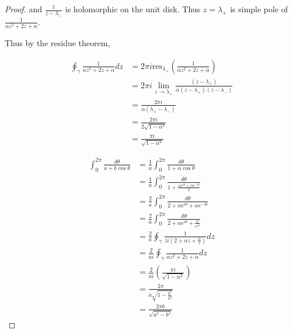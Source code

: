 \documentclass{article}
\begin{document}
\begin{proof}
    and $\frac{1}{z - \lambda_-}$ is holomorphic on the unit disk. Thus $z = \lambda_+$ is simple pole of $\frac{1}{\alpha z^2 + 2 z + \alpha}$. 
    
    
    Thus by the residue theorem, 

    \begin{align*}
        \oint_{\gamma} \frac{1}{\alpha z^2 + 2 z + \alpha} dz &= 2 \pi i \text{res}_{\lambda_{+}}\left(\frac{1}{\alpha z^2 + 2z + \alpha}\right) \\
        &= 2 \pi i \lim_{z \to \lambda_+} \frac{(z - \lambda_+)}{\alpha (z - \lambda_+)(z - \lambda_-)} \\
        &= \frac{2 \pi i}{\alpha(\lambda_+ - \lambda_-)} \\
        &= \frac{2 \pi i}{2\sqrt{1 - \alpha^2}} \\
        &= \frac{\pi i}{\sqrt{1 - \alpha^2}} 
    \end{align*}

    \begin{align*}
        \int_{0}^{2 \pi} \frac{d \theta}{a + b \cos \theta} 
        &= \frac{1}{a} \int_{0}^{2 \pi} \frac{d \theta}{1 + \alpha \cos \theta} \\
        &= \frac{1}{a} \int_{0}^{2 \pi} \frac{d \theta}{1 + \frac{\alpha e^{i \theta} + \alpha e^{-i \theta}}{2}} \\
        &= \frac{2}{a} \int_{0}^{2 \pi} \frac{d \theta}{2 + \alpha e^{i \theta} + \alpha e^{-i \theta}} \\
        &= \frac{2}{a} \int_{0}^{2 \pi} \frac{d \theta}{2 + \alpha e^{i \theta} + \frac{\alpha}{e^{i \theta}}}\\
        &= \frac{2}{a} \oint_{\gamma} \frac{1}{zi(2 + \alpha z + \frac{\alpha}{z})} dz \\
        &= \frac{2}{ai} \oint_{\gamma} \frac{1}{\alpha z^2 + 2 z + \alpha} dz \\
        &= \frac{2}{ai} \left(\frac{\pi i}{\sqrt{1 - \alpha^2}}\right) \\
        &= \frac{2 \pi}{a \sqrt{1 - \frac{b^2}{a^2}}} \\ 
        &= \frac{2 \pi b}{\sqrt{a^2 - b^2}}
    \end{align*}
\end{proof}

\bigskip
\end{document}
